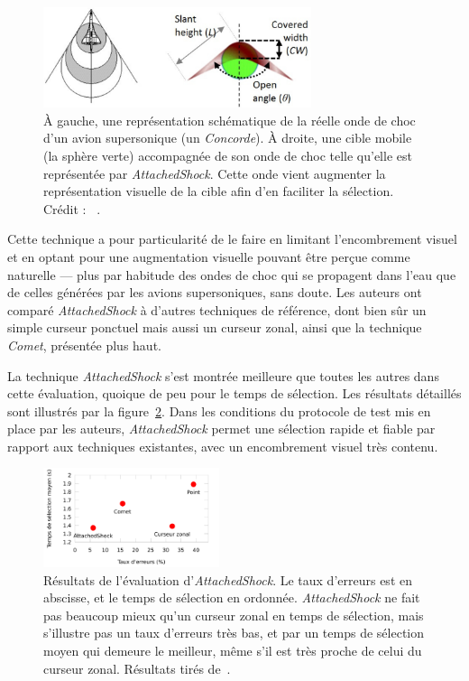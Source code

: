 	\begin{figure}[!htb]
		\centering
		\includegraphics[width=0.70\textwidth]{figures/ch2/asas}
		\caption[\emph{AttachedShock}, onde de choc]{À gauche, une représentation schématique de la réelle onde de choc d'un avion supersonique (un \emph{Concorde}). À droite, une cible mobile (la sphère verte) accompagnée de son onde de choc telle qu'elle est représentée par \emph{AttachedShock}. Cette onde vient augmenter la représentation visuelle de la cible afin d'en faciliter la sélection. Crédit : ~\cite{you2012attachedshock}.}
		\label{fig:asas}
	\end{figure}
	
Cette technique a pour particularité de le faire en limitant l'encombrement visuel et en optant pour une augmentation visuelle pouvant être perçue comme \og naturelle \fg{} --- plus par habitude des ondes de choc qui se propagent dans l'eau que de celles générées par les avions supersoniques, sans doute. Les auteurs ont comparé \emph{AttachedShock} à d'autres techniques de référence, dont bien sûr un simple curseur ponctuel mais aussi un curseur zonal, ainsi que la technique \emph{Comet}, présentée plus haut.

La technique \emph{AttachedShock} s'est montrée meilleure que toutes les autres dans cette évaluation, quoique de peu pour le temps de sélection. Les résultats détaillés sont illustrés par la figure~\ref{fig:asRes}. Dans les conditions du protocole de test mis en place par les auteurs, \emph{AttachedShock} permet une sélection rapide et fiable par rapport aux techniques existantes, avec un encombrement visuel très contenu.

	\begin{figure} %
		\centering
		\includegraphics[width=0.46\textwidth]{figures/ch2/asRes}
		\caption[\emph{AttachedShock}, performance]{Résultats de l'évaluation d'\emph{AttachedShock}. Le taux d'erreurs est en abscisse, et le temps de sélection en ordonnée. \emph{AttachedShock} ne fait pas beaucoup mieux qu'un curseur zonal en temps de sélection, mais s'illustre pas un taux d'erreurs très bas, et par un temps de sélection moyen qui demeure le meilleur, même s'il est très proche de celui du curseur zonal. Résultats tirés de~\cite{you2012attachedshock}.}
		\label{fig:asRes}
	\end{figure}

